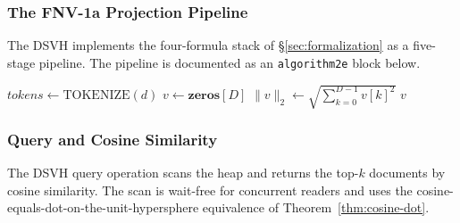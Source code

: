 \subsubsection{The FNV-1a Projection Pipeline}

The DSVH implements the four-formula stack of \S\ref{sec:formalization}
as a five-stage pipeline. The pipeline is documented as an
\texttt{algorithm2e} block below.

\begin{algorithm}[t]
\caption{DSVH FNV-1a Projection Pipeline}
\label{alg:dsvh-pipeline}
\SetAlgoLined
{}
\BlankLine
$\mathit{tokens} \gets \mathrm{TOKENIZE}(d)$ 
$v \gets \mathbf{zeros}[D]$\;
$\|v\|_2 \gets \sqrt{\sum_{k=0}^{D-1} v[k]^2}$\;
\KwRet $v$\;
\caption*{The four-formula projection pipeline:
\texttt{TOKENIZE} $\to$ \texttt{FNV1a} $\to$ sign extraction $\to$
$L_2$ normalization. The pipeline produces the normalized vector
$v \in S^{127}$ that is the canonical input to the cosine similarity
ranking of \texttt{Query}.}
\end{algorithm}

\subsubsection{Query and Cosine Similarity}

The DSVH query operation scans the heap and returns the top-$k$
documents by cosine similarity. The scan is wait-free for concurrent
readers and uses the cosine-equals-dot-on-the-unit-hypersphere
equivalence of Theorem~\ref{thm:cosine-dot}.

